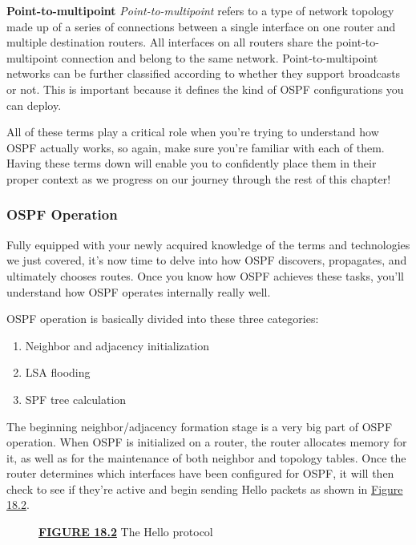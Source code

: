\textbf{Point-to-multipoint} \emph{Point-to-multipoint} refers to a type
of network topology made up of a series of connections between a single
interface on one router and multiple destination routers. All interfaces
on all routers share the point-to-multipoint connection and belong to
the same network. Point-to-multipoint networks can be further classified
according to whether they support broadcasts or not. This is important
because it defines the kind of OSPF configurations you can deploy.

All of these terms play a critical role when you're trying to understand
how OSPF actually works, so again, make sure you're familiar with each
of them. Having these terms down will enable you to confidently place
them in their proper context as we progress on our journey through the
rest of this chapter!

\subsubsection[OSPF
Operation]{\texorpdfstring{\protect\hypertarget{c18.xhtmlux5cux23c18-sec-3}{}{}OSPF
Operation}{OSPF Operation}}

Fully equipped with your newly acquired knowledge of the terms and
technologies we just covered, it's now time to delve into how OSPF
discovers, propagates, and ultimately chooses routes. Once you know how
OSPF achieves these tasks, you'll understand how OSPF operates
internally really well.

OSPF operation is basically divided into these three categories:

\begin{enumerate}
\item
  Neighbor and adjacency initialization
\item
  LSA flooding
\item
  SPF tree calculation
\end{enumerate}

The beginning neighbor/adjacency formation stage is a very big part of
OSPF operation. When OSPF is initialized on a router, the router
allocates memory for it, as well as for the maintenance of both neighbor
and topology tables. Once the router determines which interfaces have
been configured for OSPF, it will then check to see if they're active
and begin sending Hello packets as shown in
\protect\hyperlink{c18.xhtmlux5cux23figure18-2}{Figure 18.2}.

\begin{figure}
\centering
\caption{{\protect\hyperlink{c18.xhtmlux5cux23figureanchor18-2}{\textbf{FIGURE
18.2}} The Hello protocol}}
\end{figure}

